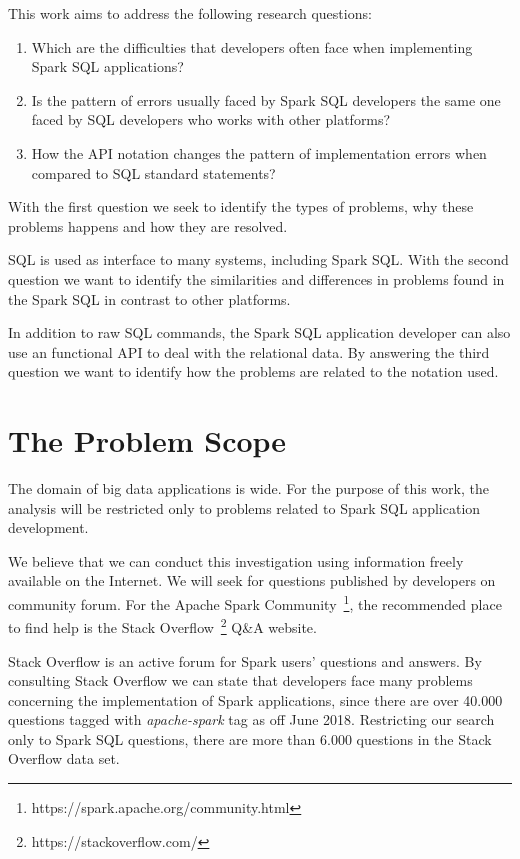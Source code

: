 This work aims to address the following research questions:

\begin{enumerate}
    \item Which are the difficulties that developers often face when implementing Spark SQL applications?
    
    \item Is the pattern of errors usually faced by Spark SQL developers the same one faced by SQL developers who works with other platforms?
    
    \item How the API notation changes the pattern of implementation errors when compared to SQL standard statements?
    
\end{enumerate}

With the first question we seek to identify the types of problems, why these problems happens and how they are resolved. 

SQL is used as interface to many systems, including Spark SQL. With the second question  we want to identify the similarities and differences in problems found in the Spark SQL in contrast to other platforms.

In addition to raw SQL commands, the Spark SQL application developer can also use an functional API to deal with the relational data. By answering the third question we want to identify how the problems are related to the notation used.
    
\section{The Problem Scope}

The domain of big data applications is wide. For the purpose of this work, the analysis will be restricted only to problems related to Spark SQL application development. 

We believe that we can conduct this investigation using information freely available on the Internet. We will seek for questions published by developers on community forum. For the Apache Spark Community~\footnote{https://spark.apache.org/community.html}, the recommended place to find help is the Stack Overflow~\footnote{https://stackoverflow.com/} Q\&A website. 

Stack Overflow is an active forum for Spark users’ questions and answers. By consulting Stack Overflow we can state that developers face many problems concerning the implementation of Spark applications, since there are over 40.000 questions tagged with \emph{apache-spark} tag as off June 2018. Restricting our search only to Spark SQL questions, there are more than 6.000 questions in the Stack Overflow data set.

